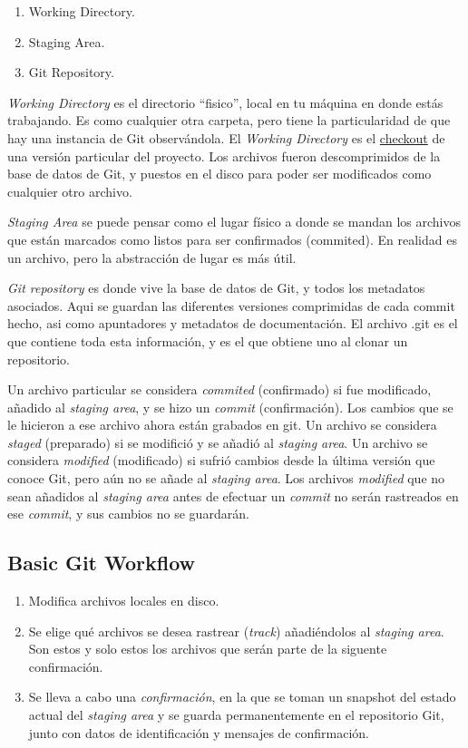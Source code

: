 \documentclass[spanish, 12pt, a4paper]{article}
\begin{document}
\begin{enumerate}
\item
  Working Directory.
\item
  Staging Area.
\item
  Git Repository.
\end{enumerate}

\emph{Working Directory} es el directorio ``fisico'', local en tu
máquina en donde estás trabajando. Es como cualquier otra carpeta, pero
tiene la particularidad de que hay una instancia de Git observándola. El
\emph{Working Directory} es el \underline{checkout} de una versión
particular del proyecto. Los archivos fueron descomprimidos de la base
de datos de Git, y puestos en el disco para poder ser modificados como
cualquier otro archivo.

\emph{Staging Area} se puede pensar como el lugar físico a donde se
mandan los archivos que están marcados como listos para ser confirmados
(commited). En realidad es un archivo, pero la abstracción de lugar es
más útil.

\emph{Git repository} es donde vive la base de datos de Git, y todos los
metadatos asociados. Aqui se guardan las diferentes versiones
comprimidas de cada commit hecho, asi como apuntadores y metadatos de
documentación. El archivo .git es el que contiene toda esta información,
y es el que obtiene uno al clonar un repositorio.

Un archivo particular se considera \emph{commited} (confirmado) si fue
modificado, añadido al \emph{staging area}, y se hizo un \emph{commit}
(confirmación). Los cambios que se le hicieron a ese archivo ahora están
grabados en git. Un archivo se considera \emph{staged} (preparado) si se
modifició y se añadió al \emph{staging area}. Un archivo se considera
\emph{modified} (modificado) si sufrió cambios desde la última versión
que conoce Git, pero aún no se añade al \emph{staging area}. Los
archivos \emph{modified} que no sean añadidos al \emph{staging area}
antes de efectuar un \emph{commit} no serán rastreados en ese
\emph{commit}, y sus cambios no se guardarán.


\subsection{Basic Git Workflow}

\begin{enumerate}
\item
  Modifica archivos locales en disco.
\item
  Se elige qué archivos se desea rastrear (\emph{track}) añadiéndolos al
  \emph{staging area}. Son estos y solo estos los archivos que serán
  parte de la siguente confirmación.
\item
  Se lleva a cabo una \emph{confirmación}, en la que se toman un
  snapshot del estado actual del \emph{staging area} y se guarda
  permanentemente en el repositorio Git, junto con datos de
  identificación y mensajes de confirmación.
\end{enumerate}
\end{document}

